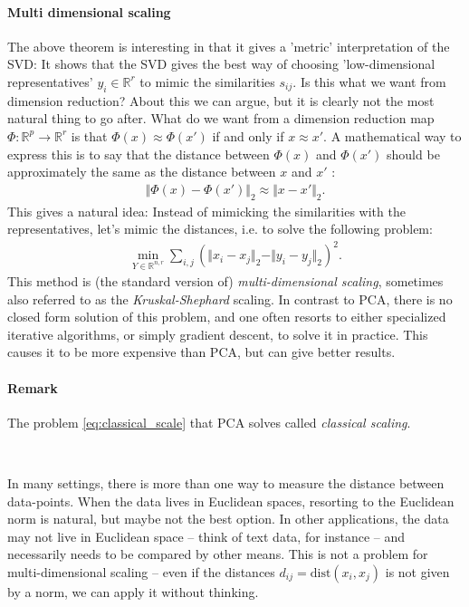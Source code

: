 \documentclass{article}
\newcommand{\R}{\mathbb{R}}
\newcommand{\norm}[1]{\Vert #1 \Vert}
\begin{document}
\paragraph{Multi dimensional scaling} The above theorem is interesting in that it gives a 'metric' interpretation of the SVD: It shows that the SVD gives the best way of choosing 'low-dimensional representatives' $y_i\in \R^r$ to mimic the similarities $s_{ij}$. Is this what we want from dimension reduction? About this we can argue, but it is clearly not the most natural thing to go after.  What do we want from a dimension reduction map $\Phi: \R^p \to \R^r$ is that $\Phi(x)\approx \Phi(x')$ if and only if $x\approx x'$. A mathematical way to express this is to say that the distance between $\Phi(x)$ and $\Phi(x')$ should be approximately the same as the distance between $x$ and $x'$ :
\begin{align} \label{eq:metric}
    \norm{\Phi(x)-\Phi(x')}_2 \approx \norm{x-x'}_2.
\end{align}
 This gives a natural idea: Instead of mimicking the similarities with the representatives, let's mimic the distances, i.e. to solve the following problem:
\begin{align*}
    \min_{Y \in \R^{n,r}} \sum_{i,j} (\norm{x_i-x_j}_2-\norm{y_i-y_j}_2)^2.
\end{align*}
This method is (the standard version of) \emph{multi-dimensional scaling}, sometimes also referred to as the \emph{Kruskal-Shephard} scaling. In contrast to PCA, 
there is no closed form solution of this problem, and one often resorts to either specialized iterative algorithms, or simply gradient descent, to solve it in practice. This causes it to be more expensive than PCA, but can give better results.




\paragraph{Remark} The problem \eqref{eq:classical_scale} that PCA solves called \emph{classical scaling}.

\

In many settings, there is more than one way to measure the distance between data-points. When the data lives in Euclidean spaces, resorting to the Euclidean norm is natural, but maybe not the best option. In other applications, the data may not live in Euclidean space -- think of text data, for instance -- and necessarily needs to be compared by other means. This is not a problem for multi-dimensional scaling -- even if the distances $d_{ij}= \mathrm{dist}(x_i,x_j)$ is not given by a norm, we can apply it without thinking.
\end{document}
